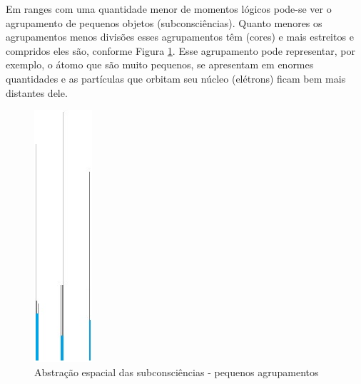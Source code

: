 Em ranges com uma quantidade menor de momentos lógicos pode-se ver o agrupamento de pequenos objetos (subconsciências). Quanto menores os agrupamentos menos divisões esses agrupamentos têm (cores) e mais estreitos e compridos eles são, conforme Figura \ref{fig:consciousness_space_subconsciousness_min}. Esse agrupamento pode representar, por exemplo, o átomo que são muito pequenos, se apresentam em enormes quantidades e as partículas que orbitam seu núcleo (elétrons) ficam bem mais distantes dele.
	\begin{figure}[H]
	\caption{Abstração espacial das subconsciências - pequenos agrupamentos}
	\label{fig:consciousness_space_subconsciousness_min}
	\centering
	\includegraphics[scale=.9]{sections/images/consciousness_space_subconsciousness_min.jpg}
	\end{figure}

